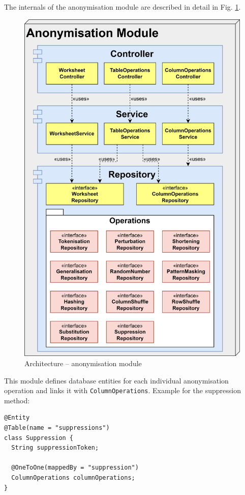 \documentclass[a4paper,twoside,12pt]{book}
\begin{document}
The internals of the anonymisation module are described in detail in Fig. \ref{fig:architecture_anonymisation}.
%
\begin{figure}
  \centering
  \includegraphics[width=\linewidth]{img/architecture_anonymisation.png}
  \caption{Architecture – anonymisation module}
  \label{fig:architecture_anonymisation}
\end{figure}
%
This module defines database entities for each individual anonymisation operation and links it with \texttt{ColumnOperations}. Example for the suppression method:

\begin{verbatim}
@Entity
@Table(name = "suppressions")
class Suppression {
  String suppressionToken;

  @OneToOne(mappedBy = "suppression")
  ColumnOperations columnOperations;
}
\end{verbatim}
\end{document}
